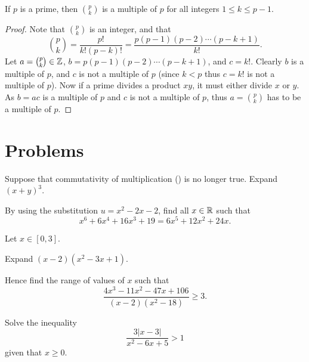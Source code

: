 \begin{proposition}\label{prop-binomial-coefficient-multiple-of-p}
    If $p$ is a prime, then $p\choose k$ is a multiple of $p$ for all integers $1 \leq k \leq p - 1$.
\end{proposition}
\begin{proof}
    Note that $p \choose k$ is an integer, and that
    \[
        {p \choose k} = \frac{p!}{k!(p-k)!} = \frac{p(p-1)(p-2)\cdots(p-k+1)}{k!}.
    \]
    Let $a = {p \choose k} \in \mathbb{Z}$, $b = p(p-1)(p-2)\cdots(p-k+1)$, and $c = k!$. Clearly $b$ is a multiple of $p$, and $c$ is not a multiple of $p$ (since $k < p$ thus $c = k!$ is not a multiple of $p$). Now if a prime divides a product $xy$, it must either divide $x$ or $y$. As $b = ac$ is a multiple of $p$ and $c$ is not a multiple of $p$, thus $a = {p \choose k}$ has to be a multiple of $p$.
\end{proof}



\section{Problems}
\begin{problem}
    Suppose that commutativity of multiplication () is no longer true. Expand $(x+y)^3$.
\end{problem}

\begin{problem}
    By using the substitution $u = x^2 - 2x - 2$, find all $x \in \mathbb{R}$ such that
    \[
        x^6 + 6x^4 + 16x^3 + 19 = 6x^5 + 12x^2 + 24x.
    \]
\end{problem}

\begin{problem}
    Let $x \in [0,3]$.
    \begin{partquestions}{\roman*}
        \item Expand $(x-2)(x^2-3x+1)$.
        \item Hence find the range of values of $x$ such that
        \[
            \frac{4x^3 - 11x^2 - 47x + 106}{(x-2)(x^2-18)} \geq 3.
        \]
    \end{partquestions}
\end{problem}

\begin{problem}
    Solve the inequality
    \[
        \frac{3|x-3|}{x^2-6x+5} > 1
    \]
    given that $x \geq 0$.
\end{problem}

